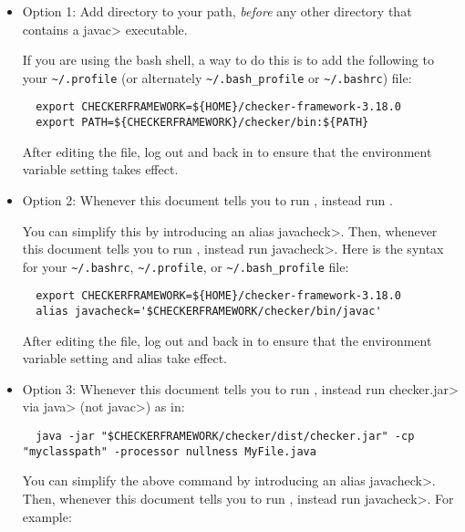 \begin{itemize}
  \item
    Option 1:
    Add directory
     to your path, \emph{before} any other
    directory that contains a \<javac> executable.

    If you are
    using the bash shell, a way to do this is to add the following to your
    \verb|~/.profile| (or alternately \verb|~/.bash_profile| or \verb|~/.bashrc|) file:
\begin{Verbatim}
  export CHECKERFRAMEWORK=${HOME}/checker-framework-3.18.0
  export PATH=${CHECKERFRAMEWORK}/checker/bin:${PATH}
\end{Verbatim}

   After editing the file, log out and back in to ensure that the environment variable
   setting takes effect.

  \item
    \begin{sloppypar}
    Option 2:
    Whenever this document tells you to run ,
    instead run .
    \end{sloppypar}

    You can simplify this by introducing an alias \<javacheck>.  Then,
    whenever this document tells you to run , instead run
    \<javacheck>.  Here is the syntax for your
    \verb|~/.bashrc|, \verb|~/.profile|, or \verb|~/.bash_profile|
    file:
\begin{Verbatim}
  export CHECKERFRAMEWORK=${HOME}/checker-framework-3.18.0
  alias javacheck='$CHECKERFRAMEWORK/checker/bin/javac'
\end{Verbatim}

   After editing the file, log out and back in to ensure that the environment variable
   setting and alias take effect.

   \item
   Option 3:
   Whenever this document tells you to run , instead
   run \<checker.jar> via \<java> (not \<javac>) as in:

\begin{Verbatim}
  java -jar "$CHECKERFRAMEWORK/checker/dist/checker.jar" -cp "myclasspath" -processor nullness MyFile.java
\end{Verbatim}

    You can simplify the above command by introducing an alias
    \<javacheck>.  Then, whenever this document tells you to run
    , instead run \<javacheck>.  For example:


\end{itemize}
